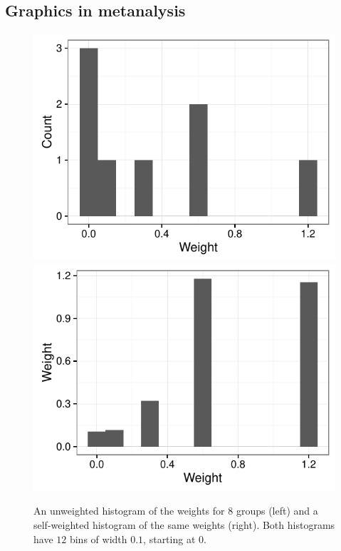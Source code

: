 \documentclass{svmult}
\begin{document}
\subsection{Graphics in metanalysis}
\label{meta}

\begin{figure}
  \centering
  \includegraphics[width=\linewidth]{meta}
  \includegraphics[width=\linewidth]{meta-weighted}
  \caption{An unweighted histogram of the weights for $8$ groups (left) and a self-weighted histogram of the same weights (right).  Both histograms have $12$ bins of width $0.1$, starting at $0$.}
  \label{hc} 
\end{figure}
\end{document}
